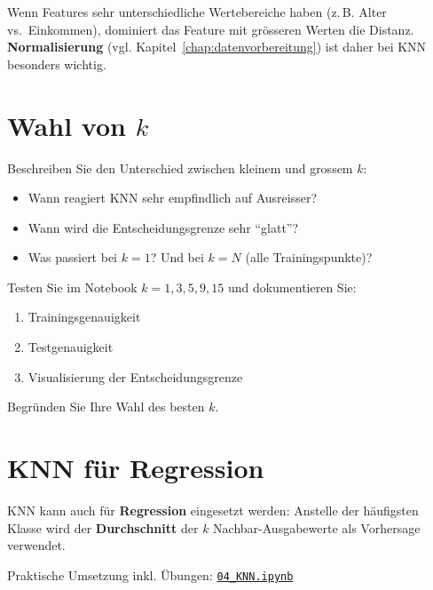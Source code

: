 \begin{mycaution}
Wenn Features sehr unterschiedliche Wertebereiche haben (z.\,B. Alter vs.\ Einkommen),
dominiert das Feature mit grösseren Werten die Distanz.
\textbf{Normalisierung} (vgl. Kapitel~\cref{chap:datenvorbereitung}) ist daher bei KNN besonders wichtig.
\end{mycaution}

\section{Wahl von \texorpdfstring{$k$}{k}}

\begin{myexercise}
Beschreiben Sie den Unterschied zwischen kleinem und grossem $k$:
\begin{itemize}
    \item Wann reagiert KNN sehr empfindlich auf Ausreisser?
    \item Wann wird die Entscheidungsgrenze sehr \enquote{glatt}?
    \item Was passiert bei $k = 1$? Und bei $k = N$ (alle Trainingspunkte)?
\end{itemize}
\end{myexercise}

\begin{mychallenge}
Testen Sie im Notebook $k = 1, 3, 5, 9, 15$ und dokumentieren Sie:
\begin{enumerate}
    \item Trainingsgenauigkeit
    \item Testgenauigkeit
    \item Visualisierung der Entscheidungsgrenze
\end{enumerate}
Begründen Sie Ihre Wahl des besten $k$.
\end{mychallenge}

\section{KNN für Regression}

KNN kann auch für \textbf{Regression} eingesetzt werden:
Anstelle der häufigsten Klasse wird der \textbf{Durchschnitt} der $k$ Nachbar-Ausgabewerte
als Vorhersage verwendet.

\begin{myremark}[Notebook]
Praktische Umsetzung inkl. Übungen:
\href{\notebookbaseurl04_KNN_Classification.ipynb}{\texttt{04\_KNN.ipynb}}
\end{myremark}
